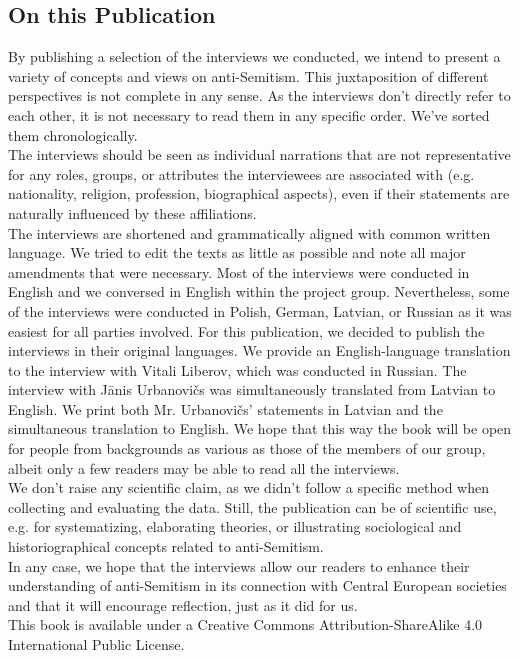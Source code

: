\subsection*{On this Publication}
By publishing a selection of the interviews we conducted, we intend to present a variety of concepts and views on anti-Semitism. This juxtaposition of different perspectives is not complete in any sense. As the interviews don’t directly refer to each other, it is not necessary to read them in any specific order. We've sorted them chronologically. \\ 
The interviews should be seen as individual narrations that are not representative for any roles, groups, or attributes the interviewees are associated with (e.g. nationality, religion, profession, biographical aspects), even if their statements are naturally influenced by these affiliations. \\
The interviews are shortened and grammatically aligned with common written language. We tried to edit the texts as little as possible and note all major amendments that were necessary. Most of the interviews were conducted in English and we conversed in English within the project group. Nevertheless, some of the interviews were conducted in Polish, German, Latvian, or Russian as it was easiest for all parties involved. For this publication, we decided to publish the interviews in their original languages. We provide an English-language translation to the interview with Vitali Liberov, which was conducted in Russian. The interview with Jānis Urbanovičs was simultaneously translated from Latvian to English. We print both Mr. Urbanovičs' statements in Latvian and the simultaneous translation to English. We hope that this way the book will be open for people from backgrounds as various as those of the members of our group, albeit only a few readers may be able to read all the interviews.\\
We don’t raise any scientific claim, as we didn’t follow a specific method when collecting and evaluating the data. Still, the publication can be of scientific use, e.g. for systematizing, elaborating theories, or illustrating sociological and historiographical concepts related to anti-Semitism.\\
In any case, we hope that the interviews allow our readers to enhance their understanding of anti-Semitism in its connection with Central European societies and that it will encourage reflection, just as it did for us.\\
This book is available under a Creative Commons Attribution-ShareAlike 4.0 International Public License. 
